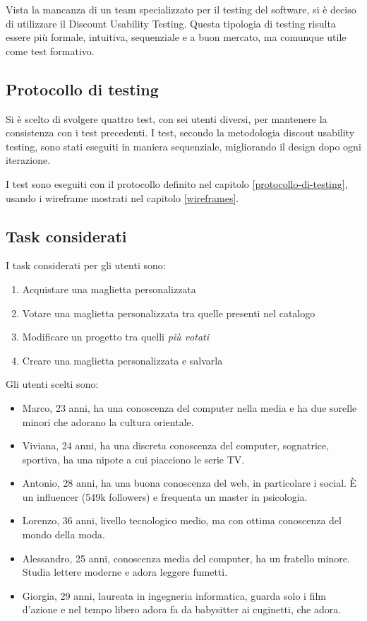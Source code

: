 \documentclass[12pt,italian,]{report}
\providecommand{\tightlist}{%
  \setlength{\itemsep}{0pt}\setlength{\parskip}{0pt}}
\begin{document}
Vista la mancanza di un team specializzato per il testing del software,
si è deciso di utilizzare il Discount Usability Testing. Questa
tipologia di testing risulta essere più formale, intuitiva, sequenziale
e a buon mercato, ma comunque utile come test formativo.

\hypertarget{protocollo-di-testing-1}{%
\subsection{Protocollo di testing}\label{protocollo-di-testing-1}}

Si è scelto di svolgere quattro test, con sei utenti diversi, per
mantenere la consistenza con i test precedenti. I test, secondo la
metodologia discout usability testing, sono stati eseguiti in maniera
sequenziale, migliorando il design dopo ogni iterazione.

I test sono eseguiti con il protocollo definito nel capitolo \ref{protocollo-di-testing}, usando i wireframe mostrati nel capitolo \ref{wireframes}.

\hypertarget{task-considerati}{%
\subsection{Task considerati}\label{task-considerati}}

I task considerati per gli utenti sono:

\begin{enumerate}
\def\labelenumi{\arabic{enumi}.}
\tightlist
\item
  Acquistare una maglietta personalizzata
\item
  Votare una maglietta personalizzata tra quelle presenti nel catalogo
\item
  Modificare un progetto tra quelli \emph{più votati}
\item
  Creare una maglietta personalizzata e salvarla
\end{enumerate}

Gli utenti scelti sono:

\begin{itemize}
\tightlist
\item
  Marco, 23 anni, ha una conoscenza del computer nella media e  ha due sorelle minori che adorano la cultura orientale.
\item
  Viviana, 24 anni, ha una discreta conoscenza del computer, sognatrice,
  sportiva, ha una nipote a cui piacciono le serie TV.
\item
  Antonio, 28 anni, ha una buona conoscenza del web, in particolare i
  social. È un influencer (549k followers) e frequenta un master in
  psicologia.
\item
  Lorenzo, 36 anni, livello tecnologico medio, ma con ottima conoscenza
  del mondo della moda.
\item
  Alessandro, 25 anni, conoscenza media del computer, ha un fratello
  minore. Studia lettere moderne e adora leggere fumetti.
\item
  Giorgia, 29 anni, laureata in ingegneria informatica, guarda solo i
  film d'azione e nel tempo libero adora fa da babysitter ai cuginetti,
  che adora.
\end{itemize}
\end{document}
